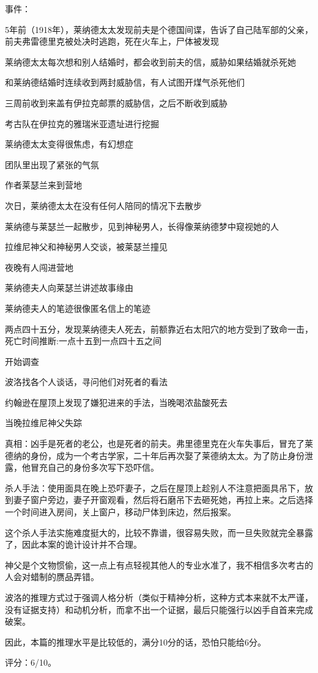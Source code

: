 事件：
\begin{itemize*}
    \item 5年前（1918年），莱纳德太太发现前夫是个德国间谍，告诉了自己陆军部的父亲，前夫弗雷德里克被处决时逃跑，死在火车上，尸体被发现
    \item 莱纳德太太每次想和别人结婚时，都会收到前夫的信，威胁如果结婚就杀死她
    \item 和莱纳德结婚时连续收到两封威胁信，有人试图开煤气杀死他们
    \item 三周前收到来盖有伊拉克邮票的威胁信，之后不断收到威胁

    \item 考古队在伊拉克的雅瑞米亚遗址进行挖掘
    \item 莱纳德太太变得很焦虑，有幻想症
    \item 团队里出现了紧张的气氛
    \item 作者莱瑟兰来到营地
    \item 次日，莱纳德太太在没有任何人陪同的情况下去散步
    \item 莱纳德与莱瑟兰一起散步，见到神秘男人，长得像莱纳德梦中窥视她的人
    \item 拉维尼神父和神秘男人交谈，被莱瑟兰撞见
    \item 夜晚有人闯进营地
    \item 莱纳德夫人向莱瑟兰讲述故事缘由
    \item 莱纳德夫人的笔迹很像匿名信上的笔迹
    \item 两点四十五分，发现莱纳德夫人死去，前额靠近右太阳穴的地方受到了致命一击，死亡时间推断:一点十五到一点四十五之间

    \item 开始调查
    \item 波洛找各个人谈话，寻问他们对死者的看法
    \item 约翰逊在屋顶上发现了嫌犯进来的手法，当晚喝浓盐酸死去
    \item 当晚拉维尼神父失踪

\end{itemize*}

真相：凶手是死者的老公，也是死者的前夫。弗里德里克在火车失事后，冒充了莱德纳的身份，成为一个考古学家，二十年后再次娶了莱德纳太太。为了防止身份泄露，他冒充自己的身份多次写下恐吓信。

杀人手法：使用面具在晚上恐吓妻子，之后在屋顶上趁别人不注意把面具吊下，放到妻子窗户旁边，妻子开窗观看，然后将石磨吊下去砸死她，再拉上来。之后选择一个时间进入房间，关上窗户，移动尸体到床边，然后报案。

这个杀人手法实施难度挺大的，比较不靠谱，很容易失败，而一旦失败就完全暴露了，因此本案的诡计设计并不合理。

神父是个文物惯偷，这一点上有点轻视其他人的专业水准了，我不相信多次考古的人会对蜡制的赝品弄错。

波洛的推理方式过于强调人格分析（类似于精神分析，这种方式本来就不太严谨，没有证据支持）和动机分析，而拿不出一个证据，最后只能强行以凶手自首来完成破案。

因此，本篇的推理水平是比较低的，满分10分的话，恐怕只能给6分。

评分：6/10。
